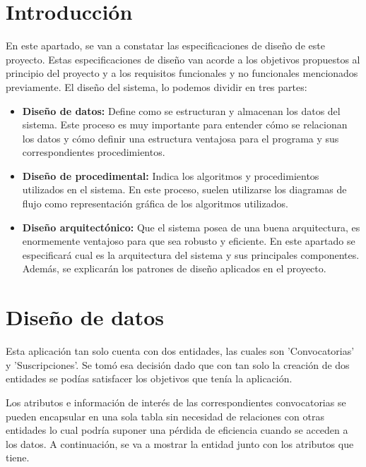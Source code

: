 
\section{Introducción}

En este apartado, se van a constatar las especificaciones de diseño de este proyecto. Estas especificaciones de diseño van acorde a los objetivos propuestos al principio del proyecto y a los requisitos funcionales y no funcionales mencionados previamente. El diseño del sistema, lo podemos dividir en tres partes:

\begin{itemize}
    \item \textbf{Diseño de datos:} Define como se estructuran y almacenan los datos del sistema. Este proceso es muy importante para entender cómo se relacionan los datos y cómo definir una estructura ventajosa para el programa y sus correspondientes procedimientos.
    \item \textbf{Diseño de procedimental:} Indica los algoritmos y procedimientos utilizados en el sistema. En este proceso, suelen utilizarse los diagramas de flujo como representación gráfica de los algoritmos utilizados. 
    \item \textbf{Diseño arquitectónico:} Que el sistema posea de una buena arquitectura, es enormemente ventajoso para que sea robusto y eficiente. En este apartado se especificará cual es la arquitectura del sistema y sus principales componentes. Además, se explicarán los patrones de diseño aplicados en el proyecto.
\end{itemize}

\section{Diseño de datos}

Esta aplicación tan solo cuenta con dos entidades, las cuales son 'Convocatorias' y 'Suscripciones'. Se tomó esa decisión dado que con tan solo la creación de dos entidades se podías satisfacer los objetivos que tenía la aplicación.

Los atributos e información de interés de las correspondientes convocatorias se pueden encapsular en una sola tabla sin necesidad de relaciones con otras entidades lo cual podría suponer una pérdida de eficiencia cuando se acceden a los datos. A continuación, se va a mostrar la entidad junto con los atributos que tiene.

